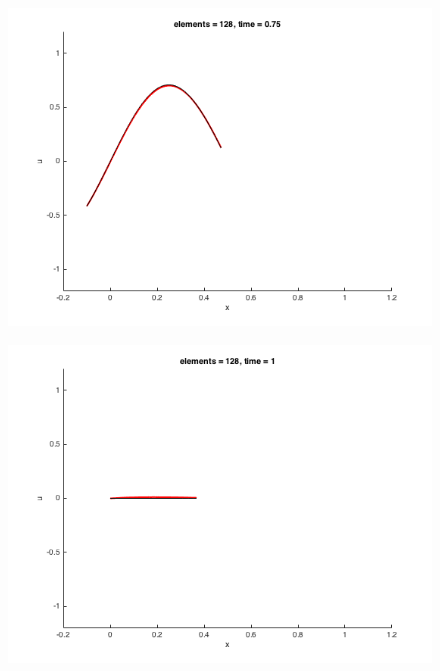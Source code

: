 \documentclass[11pt, oneside]{article}   	%
\begin{document}
\begin{figure}[h]
  \centering
  \includegraphics[width=\linewidth]{n128_t075.png}
\end{figure}

\begin{figure}[h]
  \centering
  \includegraphics[width=\linewidth]{n128_t100.png}
\end{figure}
\end{document}
